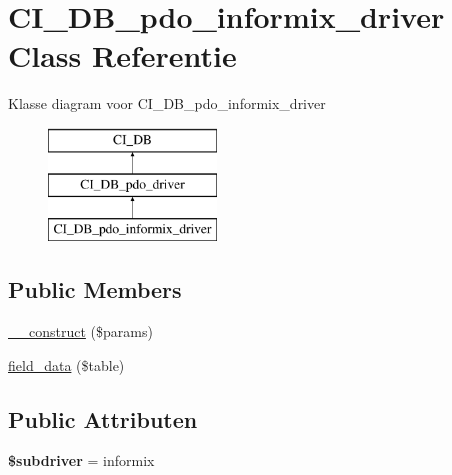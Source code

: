 \hypertarget{class_c_i___d_b__pdo__informix__driver}{}\section{C\+I\+\_\+\+D\+B\+\_\+pdo\+\_\+informix\+\_\+driver Class Referentie}
\label{class_c_i___d_b__pdo__informix__driver}
Klasse diagram voor C\+I\+\_\+\+D\+B\+\_\+pdo\+\_\+informix\+\_\+driver\begin{figure}[H]
\begin{center}
\leavevmode
\includegraphics[height=3.000000cm]{class_c_i___d_b__pdo__informix__driver}
\end{center}
\end{figure}
\subsection*{Public Members}
\begin{DoxyCompactItemize}
\item 
\mbox{\hyperlink{class_c_i___d_b__pdo__informix__driver_a9162320adff1a1a4afd7f2372f753a3e}{\+\_\+\+\_\+construct}} (\$params)
\item 
\mbox{\hyperlink{class_c_i___d_b__pdo__informix__driver_a90355121e1ed009e0efdbd544ab56efa}{field\+\_\+data}} (\$table)
\end{DoxyCompactItemize}
\subsection*{Public Attributen}
\begin{DoxyCompactItemize}
\item 
\mbox{\label{class_c_i___d_b__pdo__informix__driver_a1322ca756348b11d080cb7a4f590de15}} 
{\bfseries \$subdriver} = \textquotesingle{}informix\textquotesingle{}
\end{DoxyCompactItemize}

